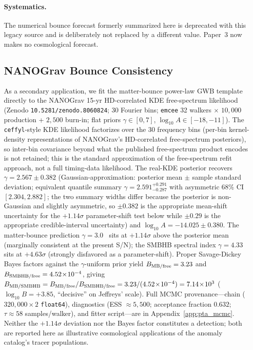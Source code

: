 \documentclass[aps,prd,twocolumn,superscriptaddress,showpacs,preprintnumbers,nofootinbib,longbibliography,floatfix]{revtex4-2}
\begin{document}
\paragraph{Systematics.}
The numerical bounce forecast formerly summarized here is deprecated with this legacy source and is deliberately not replaced by a different value. Paper~3 now makes no cosmological forecast.
\subsection{NANOGrav Bounce Consistency}\label{sec:nanograv}

As a secondary application, we fit the matter-bounce power-law GWB template directly to the NANOGrav 15-yr HD-correlated KDE free-spectrum likelihood~\cite{NANOGrav2023} (Zenodo \texttt{10.5281/zenodo.8060824}; 30 Fourier bins; \texttt{emcee} 32 walkers $\times$ $10{,}000$ production + $2{,}500$ burn-in; flat priors $\gamma \in [0,7]$, $\log_{10}A \in [-18,-11]$). The \texttt{ceffyl}-style KDE likelihood factorizes over the 30 frequency bins (per-bin kernel-density representations of NANOGrav's HD-correlated free-spectrum posteriors), so inter-bin covariance beyond what the published free-spectrum product encodes is not retained; this is the standard approximation of the free-spectrum refit approach, not a full timing-data likelihood. The real-KDE posterior recovers $\gamma = 2.567 \pm 0.382$ (Gaussian-approximation: posterior mean $\pm$ sample standard deviation; equivalent quantile summary $\gamma = 2.591^{+0.291}_{-0.287}$ with asymmetric 68\% CI $[2.304, 2.882]$; the two summary widths differ because the posterior is non-Gaussian and slightly asymmetric, so $\pm 0.382$ is the appropriate mean-shift uncertainty for the $+1.14\sigma$ parameter-shift test below while $\pm 0.29$ is the appropriate credible-interval uncertainty) and $\log_{10}A = -14.025 \pm 0.380$. The matter-bounce prediction $\gamma = 3.0$~\cite{Quintin2014,Cai2014} sits at $+1.14\sigma$ above the posterior mean (marginally consistent at the present S/N); the SMBHB spectral index $\gamma = 4.33$~\cite{Sesana2016,Burke-Spolaor2019} sits at $+4.63\sigma$ (strongly disfavored as a parameter-shift). Proper Savage-Dickey Bayes factors against the $\gamma$-uniform prior yield $B_{\rm MB/free} = 3.23$ and $B_{\rm SMBHB/free} = 4.52\!\times\!10^{-4}$, giving $B_{\rm MB/SMBHB} = B_{\rm MB/free} / B_{\rm SMBHB/free} = 3.23 / (4.52\!\times\!10^{-4}) = 7.14\!\times\!10^3$ ($\log_{10}B = +3.85$, ``decisive'' on Jeffreys' scale). Full MCMC provenance---chain ($320{,}000 \times 2$ \texttt{float64}), diagnostics (ESS $\approx 5{,}500$; acceptance fraction $0.632$; $\tau \approx 58$ samples/walker), and fitter script---are in Appendix~\ref{app:pta_mcmc}. Neither the $+1.14\sigma$ deviation nor the Bayes factor constitutes a detection; both are reported here as illustrative cosmological applications of the anomaly catalog's tracer populations.
\end{document}
